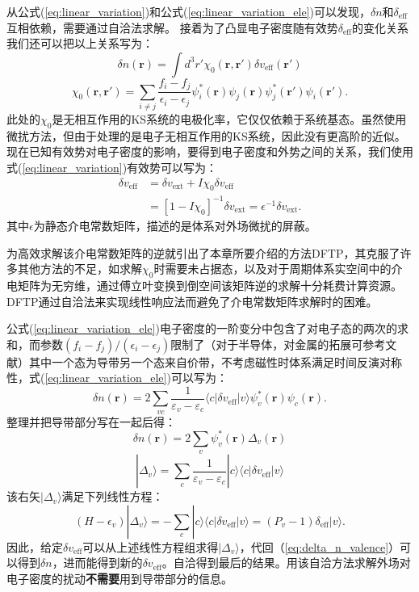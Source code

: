 从公式(\ref{eq:linear_variation})和公式(\ref{eq:linear_variation_ele})可以发现，$\delta n$和$\delta_\mathrm{eff}$互相依赖，需要通过自洽法求解。
接着为了凸显电子密度随有效势$\delta_\mathrm{eff}$的变化关系我们还可以把以上关系写为：
\begin{equation}
  \delta n(\bm{r}) = \int d^3 r' \chi_0 (\bm{r},\bm{r'})\delta v_\mathrm{eff}(\bm{r'})
\end{equation}
\begin{equation}
  \chi_0(\bm{r},\bm{r'}) = \sum_{i\neq j}\frac{f_i-f_j}{\epsilon_i-\epsilon_j} \psi^*_i(\bm{r})\psi_j(\bm{r})\psi^*_j(\bm{r'})\psi_i(\bm{r'}).
\end{equation}
此处的$\chi_0$是无相互作用的KS系统的电极化率，它仅仅依赖于系统基态。虽然使用微扰方法，但由于处理的是电子无相互作用的KS系统，因此没有更高阶的近似。
现在已知有效势对电子密度的影响，要得到电子密度和外势之间的关系，我们使用式(\ref{eq:linear_variation})有效势可以写为：
\begin{align}
  \delta v_\mathrm{eff} &= \delta v_\mathrm{ext} + I \chi_0 \delta v_\mathrm{eff} \\
  &= [1-I\chi_0]^{-1} \delta v_\mathrm{ext} = \epsilon^{-1} \delta v_\mathrm{ext}.
\end{align}
其中$\epsilon$为静态介电常数矩阵，描述的是体系对外场微扰的屏蔽。

为高效求解该介电常数矩阵的逆就引出了本章所要介绍的方法DFTP，其克服了许多其他方法的不足，如求解$\chi_0$时需要未占据态，以及对于周期体系实空间中的介电矩阵为无穷维，通过傅立叶变换到倒空间该矩阵逆的求解十分耗费计算资源。DFTP通过自洽法来实现线性响应法而避免了介电常数矩阵求解时的困难。

公式(\ref{eq:linear_variation_ele})电子密度的一阶变分中包含了对电子态的两次的求和，而参数$(f_i-f_j)/(\epsilon_i-\epsilon_j)$限制了（对于半导体，对金属的拓展可参考文献\cite{de1995lattice}）其中一个态为导带另一个态来自价带，不考虑磁性时体系满足时间反演对称性，式(\ref{eq:linear_variation_ele})可以写为：
\begin{equation}
  \delta n(\bm{r}) = 2\sum_{vc}\frac{1}{\varepsilon_v-\varepsilon_c}
  \langle c| \delta v_\mathrm{eff} | v\rangle \psi^*_v(\bm{r})\psi_c(\bm{r}).
\end{equation}
整理并把导带部分写在一起后得：
\begin{equation}\label{eq:delta_n_valence}
  \delta n(\bm{r}) = 2\sum_v \psi^*_v(\bm{r}) \Delta_v(\bm{r})
\end{equation}
\begin{equation}
  |\Delta_v \rangle = \sum_{c}\frac{1}{\varepsilon_v-\varepsilon_c}
  |c\rangle \langle c| \delta v_\mathrm{eff} | v\rangle
\end{equation}
该右矢$|\Delta_v\rangle$满足下列线性方程：
\begin{equation}
  (H-\epsilon_v)|\Delta_v\rangle = -\sum_c |c\rangle \langle c| \delta v_\mathrm{eff} | v\rangle = (P_v-1)\delta_\mathrm{eff}|v\rangle .
\end{equation}
因此，给定$\delta v_\mathrm{eff}$可以从上述线性方程组求得$|\Delta_v\rangle$，代回（\ref{eq:delta_n_valence}）可以得到$\delta n$，进而能得到新的$\delta v_\mathrm{eff}$。自洽得到最后的结果。用该自洽方法求解外场对电子密度的扰动{\textbf{不需要}}用到导带部分的信息。

